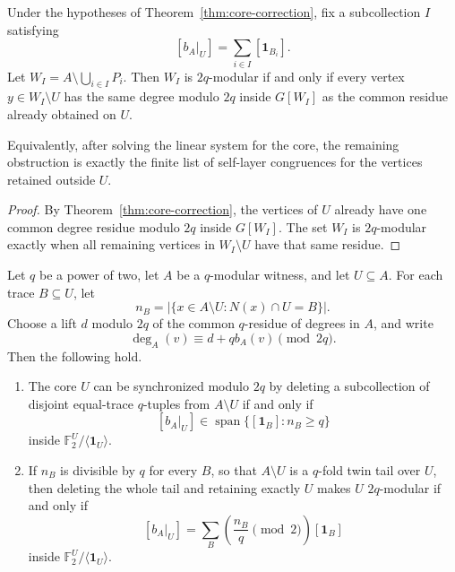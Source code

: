 \documentclass[thmsec,dntnbr,nolinenbrs]{dmgt}
\numberwithin{equation}{section}
\newcommand{\F}{\mathbb{F}}
\newcommand{\one}{\mathbf{1}}
\newcommand{\Span}{\operatorname{span}}
\begin{document}
\begin{corollary}\label{cor:self-layer}
Under the hypotheses of Theorem~\ref{thm:core-correction}, fix a subcollection \(I\) satisfying
\[
        [b_A|_U]=\sum_{i\in I}[\one_{B_i}].
\]
Let \(W_I=A\setminus\bigcup_{i\in I}P_i\).  Then \(W_I\) is \(2q\)-modular if and only if every vertex \(y\in W_I\setminus U\) has the same degree modulo \(2q\) inside \(G[W_I]\) as the common residue already obtained on \(U\).

Equivalently, after solving the linear system for the core, the remaining obstruction is exactly the finite list of self-layer congruences for the vertices retained outside \(U\).
\end{corollary}

\begin{proof}
By Theorem~\ref{thm:core-correction}, the vertices of \(U\) already have one common degree residue modulo \(2q\) inside \(G[W_I]\).  The set \(W_I\) is \(2q\)-modular exactly when all remaining vertices in \(W_I\setminus U\) have that same residue.
\end{proof}

\begin{theorem}\label{thm:trace-multiplicity}
Let \(q\) be a power of two, let \(A\) be a \(q\)-modular witness, and let \(U\subseteq A\).  For each trace \(B\subseteq U\), let
\[
        n_B=|\{x\in A\setminus U:N(x)\cap U=B\}|.
\]
Choose a lift \(d\) modulo \(2q\) of the common \(q\)-residue of degrees in \(A\), and write
\[
        \deg_A(v)\equiv d+qb_A(v)\pmod{2q}.
\]
Then the following hold.
\begin{enumerate}[label=\textup{(\arabic*)}, leftmargin=*]
    \item The core \(U\) can be synchronized modulo \(2q\) by deleting a subcollection of disjoint equal-trace \(q\)-tuples from \(A\setminus U\) if and only if
    \[
        [b_A|_U]\in \Span\{[\one_B]:n_B\ge q\}
    \]
    inside \(\F_2^U/\langle \one_U\rangle\).
    \item If \(n_B\) is divisible by \(q\) for every \(B\), so that \(A\setminus U\) is a \(q\)-fold twin tail over \(U\), then deleting the whole tail and retaining exactly \(U\) makes \(U\) \(2q\)-modular if and only if
    \[
        [b_A|_U]=\sum_B\left(\frac{n_B}{q}\pmod 2\right)[\one_B]
    \]
    inside \(\F_2^U/\langle \one_U\rangle\).
\end{enumerate}
\end{theorem}
\end{document}
